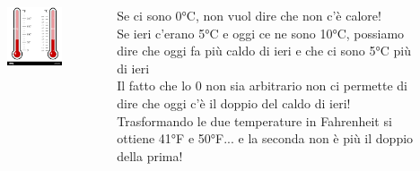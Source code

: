 \documentclass[compress]{beamer}
\begin{document}
\begin{frame}
	\begin{columns}[T]
		\begin{column}{.50\linewidth}
		\begin{figure}
			\centering
			\includegraphics[width=\linewidth]{termometri}
		\end{figure}
		\end{column}
		
			\begin{column}{.50\linewidth}
Se ci sono 0°C, non vuol dire che non c'è calore! \\
Se ieri c'erano 5°C e oggi ce ne sono 10°C, possiamo dire che oggi fa più caldo di ieri e che ci sono 5°C più di ieri\\
Il fatto che lo 0 non sia arbitrario non ci permette di dire che oggi c'è il doppio del caldo di ieri! \\
Trasformando le due temperature in Fahrenheit si ottiene 41°F e 50°F... e la seconda non è più il doppio della prima!
		\end{column}
	\end{columns}

\end{frame}
\end{document}
